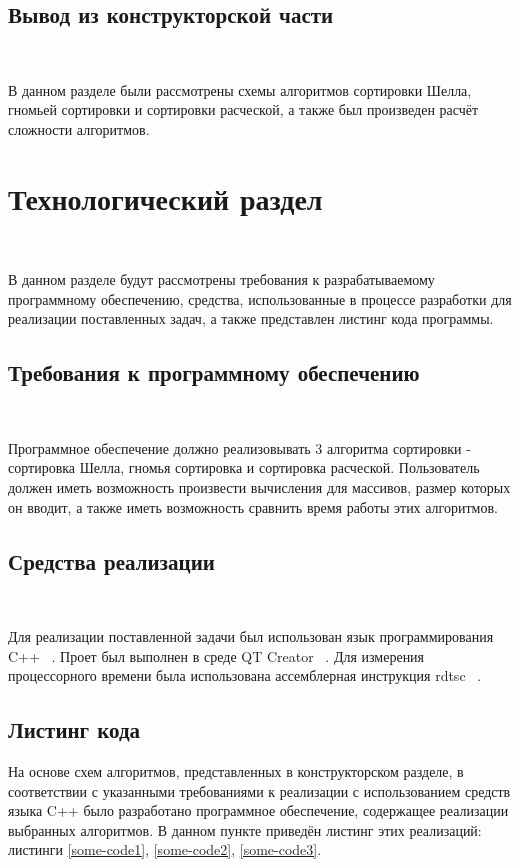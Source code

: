 \documentclass[12pt]{report}
\begin{document}
	\section{Вывод из конструкторской части}
	
	~\
	
	В данном разделе были рассмотрены схемы алгоритмов сортировки Шелла, гномьей сортировки и сортировки расческой, а также был произведен
	расчёт сложности алгоритмов.
	
	
	\chapter{Технологический раздел}
	
	~\
	
	В данном разделе будут рассмотрены требования к разрабатываемому
	программному обеспечению, средства, использованные в процессе разработки для реализации поставленных задач, а также представлен листинг кода
	программы.
	
	\section{Требования к программному обеспечению}
	
	~\
	
	Программное обеспечение должно реализовывать 3 алгоритма сортировки - сортировка Шелла, гномья сортировка и сортировка расческой. Пользователь должен иметь возможность произвести вычисления для массивов,
	размер которых он вводит, а также иметь возможность сравнить время работы этих алгоритмов.
	
	\section{Средства реализации}
	
	~\
	
	Для реализации поставленной задачи был использован язык программирования C++ ~\cite{second}. Проет был выполнен в среде QT Creator ~\cite{third}. Для измерения процессорного времени была использована ассемблерная инструкция
	rdtsc ~\cite{fourth}.
	
	\section{Листинг кода}
	
	На основе схем алгоритмов, представленных в конструкторском разделе, в соответствии с указанными требованиями к реализации с использованием средств языка C++ было разработано программное обеспечение,
	содержащее реализации выбранных алгоритмов. В данном пункте приведён листинг этих реализаций: листинги \ref{some-code1}, \ref{some-code2}, \ref{some-code3}.
	
\end{document}
